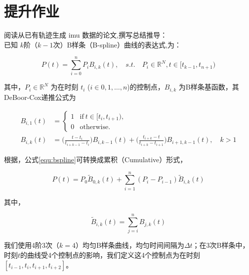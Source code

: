 \documentclass[12pt,a4paper]{article}
\begin{document}
\newpage

\section*{提升作业}

\noindent

阅读从已有轨迹生成 imu 数据的论文,撰写总结推导：\\

已知 $k$阶（$k-1$次）B样条（B-spline）曲线的表达式\cite{qinghua1998Graphics},\cite{lovegrove2013spline}为：

\begin{equation}\label{equ:bspline}
P(t) = \sum_{i=0}^n P_i B_{i,k}(t), 
\quad s.t. \quad 
P_i \in \mathbb{R}^N, t \in [t_{k-1}, t_{n+1})
\end{equation}

其中，$P_i \in \mathbb{R}^N$ 为在时刻 $t_i$ ($i \in {0,1,\dots,n}$)的控制点，$B_{i,k}$ 为B样条基函数，其DeBoor-Cox递推公式为

\begin{equation}\label{equ:deboorcox}
\begin{aligned}
B_{i,1}(t) &= 
\begin{cases}
1 & \text{if} \ t\in [t_i, t_{i+1}), \\
0 & \text{otherwise}.
\end{cases} \\
B_{i,k}(t) &= \Big(\frac{t-t_i}{t_{i+k-1}-t_i}\Big) B_{i,k-1}(t) +
              \Big(\frac{t_{i+k}-t}{t_{i+k}-t_{i+1}}\Big) B_{i+1,k-1}(t), \quad k>1
\end{aligned}
\end{equation}

根据\cite{kim1995general}，公式\eqref{equ:bspline}可转换成累积（Cumulative）形式，

\begin{equation}\label{equ:bspline_cumulative}
P(t) = P_0 \tilde{B}_{0,k}(t) + \sum_{i=1}^n (P_i - P_{i-1}) \tilde{B}_{i,k}(t)
\end{equation}

其中，

\begin{equation}\label{equ:basis_cumulative}
\tilde{B}_{i,k}(t) = \sum_{j=i}^n B_{j,k}(t)
\end{equation}

我们使用4阶3次（$k=4$）均匀B样条曲线\cite{lovegrove2013spline}，均匀时间间隔为$\Delta t$；在3次B样条中，时刻$t$的曲线受4个控制点的影响，我们定义这4个控制点为在时刻$[t_{i-1}, t_i, t_{i+1}, t_{i+2}]$。
\end{document}
